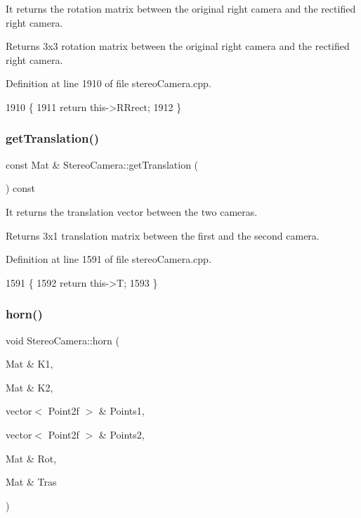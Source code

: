 It returns the rotation matrix between the original right camera and the rectified right camera. 

\begin{DoxyReturn}{Returns}
3x3 rotation matrix between the original right camera and the rectified right camera. 
\end{DoxyReturn}


Definition at line 1910 of file stereo\+Camera.\+cpp.


\begin{DoxyCode}
1910                                          \{
1911     \textcolor{keywordflow}{return} this->RRrect;
1912 \}
\end{DoxyCode}
\mbox{\label{classStereoCamera_a3ca6d46fc45835bff5fa0a5753ca40c0}} 
\subsubsection{\texorpdfstring{get\+Translation()}{getTranslation()}}
{\footnotesize\ttfamily const Mat \& Stereo\+Camera\+::get\+Translation (\begin{DoxyParamCaption}{ }\end{DoxyParamCaption}) const}



It returns the translation vector between the two cameras. 

\begin{DoxyReturn}{Returns}
3x1 translation matrix between the first and the second camera. 
\end{DoxyReturn}


Definition at line 1591 of file stereo\+Camera.\+cpp.


\begin{DoxyCode}
1591                                               \{
1592     \textcolor{keywordflow}{return} this->T;
1593 \}
\end{DoxyCode}
\mbox{\label{classStereoCamera_adf155975709fdbf09d3133899d074a02}} 
\subsubsection{\texorpdfstring{horn()}{horn()}}
{\footnotesize\ttfamily void Stereo\+Camera\+::horn (\begin{DoxyParamCaption}\item[{Mat \&}]{K1,  }\item[{Mat \&}]{K2,  }\item[{vector$<$ Point2f $>$ \&}]{Points1,  }\item[{vector$<$ Point2f $>$ \&}]{Points2,  }\item[{Mat \&}]{Rot,  }\item[{Mat \&}]{Tras }\end{DoxyParamCaption})}



